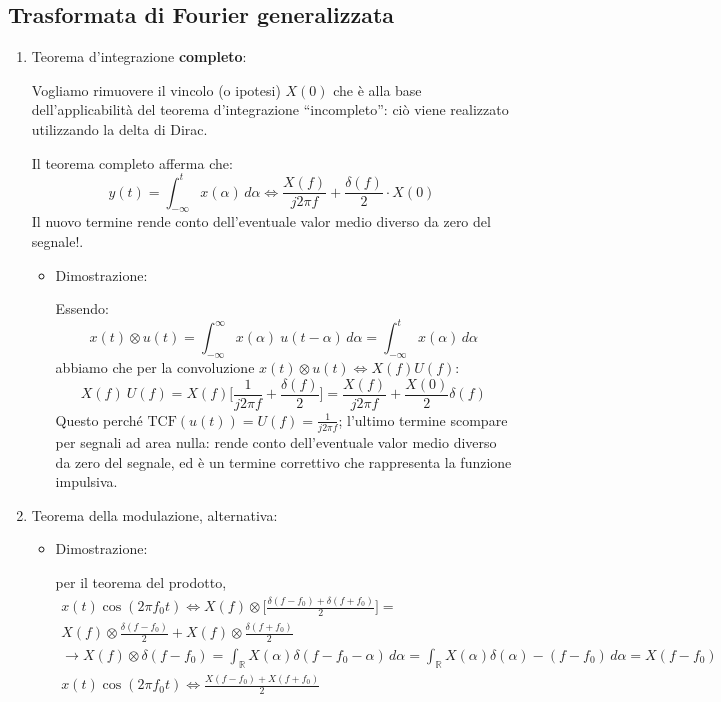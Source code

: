 \documentclass[
  paper=a4,
  ,captions=tableheading
]{scrartcl}
\begin{document}
\subsection{Trasformata di Fourier
generalizzata}\label{trasformata-di-fourier-generalizzata}

\begin{enumerate}
\def\labelenumi{\arabic{enumi}.}
\setcounter{enumi}{21}
\item
  Teorema d'integrazione \textbf{completo}:

  Vogliamo rimuovere il vincolo (o ipotesi) \(X(0)\) che è alla base
  dell'applicabilità del teorema d'integrazione ``incompleto'': ciò
  viene realizzato utilizzando la delta di Dirac.

  Il teorema completo afferma che: \[
  y(t) = \int_{-\infty}^{t} x(\alpha)\,d\alpha \Longleftrightarrow \frac{X(f)}{j2\pi f} + \frac{\delta(f)}{2}\cdot X(0)  
  \] Il nuovo termine rende conto dell'eventuale valor medio diverso da
  zero del segnale!.

  \begin{itemize}
  \item
    Dimostrazione:

    Essendo: \[
      x(t)\otimes u(t) = \int_{-\infty}^{\infty} x(\alpha) \ u(t-\alpha)\,d\alpha = \int_{-\infty}^{t} x(\alpha)\,d\alpha
      \] abbiamo che per la convoluzione
    \(x(t)\otimes u(t)\Longleftrightarrow X(f)U(f)\): \[
      X(f)\ U(f)=X(f)\Big[\frac{1}{j2\pi f}+\frac{\delta(f)}{2}\Big] = \frac{X(f)}{j2\pi f}+ \frac{X(0)}{2}\delta(f)
      \] Questo perché \(\text{TCF}(u(t))=U(f)=\frac{1}{j2\pi f}\);
    l'ultimo termine scompare per segnali ad area nulla: rende conto
    dell'eventuale valor medio diverso da zero del segnale, ed è un
    termine correttivo che rappresenta la funzione impulsiva.
  \end{itemize}
\item
  Teorema della modulazione, alternativa:

  \begin{itemize}
  \item
    Dimostrazione:

    per il teorema del prodotto, \begin{gather*}
      x(t)\cos(2\pi f_{0}t) \Longleftrightarrow X(f) \otimes \Big[ \frac{\delta(f-f_0)+\delta(f+f_0)}{2} \Big] = \\ X(f) \otimes \frac{\delta(f-f_0)}{2} + X(f) \otimes  \frac{\delta(f+f_0)}{2} \\
      \to X(f)\otimes \delta(f-f_0) = \int_{\mathbb{R}}X(\alpha) \delta(f-f_0 -\alpha)\,d\alpha = \int_{\mathbb{R}}X(\alpha) \delta(\alpha) -(f-f_0)\,d\alpha = X(f-f_0) \\
      x(t)\cos(2\pi f_0 t) \Longleftrightarrow \frac{X(f-f_0)+X(f+f_0)}{2}
      \end{gather*}
  \end{itemize}
\end{enumerate}
\end{document}
